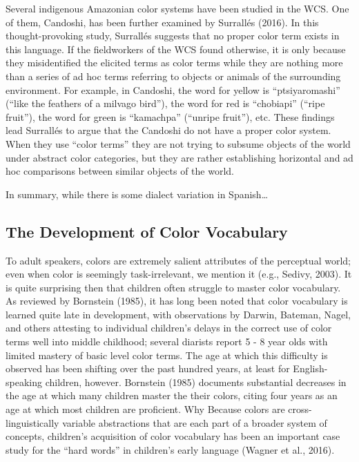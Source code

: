 \documentclass[man]{apa6}
\theoremstyle{definition}
\theoremstyle{definition}
\theoremstyle{definition}
\theoremstyle{remark}
\begin{document}
Several indigenous Amazonian color systems have been studied in the WCS.
One of them, Candoshi, has been further examined by Surrallés (2016). In
this thought-provoking study, Surrallés suggests that no proper color
term exists in this language. If the fieldworkers of the WCS found
otherwise, it is only because they misidentified the elicited terms as
color terms while they are nothing more than a series of ad hoc terms
referring to objects or animals of the surrounding environment. For
example, in Candoshi, the word for yellow is \enquote{ptsiyaromashi}
(\enquote{like the feathers of a milvago bird}), the word for red is
\enquote{chobiapi} (\enquote{ripe fruit}), the word for green is
\enquote{kamachpa} (\enquote{unripe fruit}), etc. These findings lead
Surrallés to argue that the Candoshi do not have a proper color system.
When they use \enquote{color terms} they are not trying to subsume
objects of the world under abstract color categories, but they are
rather establishing horizontal and ad hoc comparisons between similar
objects of the world.

In summary, while there is some dialect variation in Spanish\ldots{}

\subsection{The Development of Color
Vocabulary}\label{the-development-of-color-vocabulary}

To adult speakers, colors are extremely salient attributes of the
perceptual world; even when color is seemingly task-irrelevant, we
mention it (e.g., Sedivy, 2003). It is quite surprising then that
children often struggle to master color vocabulary. As reviewed by
Bornstein (1985), it has long been noted that color vocabulary is
learned quite late in development, with observations by Darwin, Bateman,
Nagel, and others attesting to individual children's delays in the
correct use of color terms well into middle childhood; several diarists
report 5 - 8 year olds with limited mastery of basic level color terms.
The age at which this difficulty is observed has been shifting over the
past hundred years, at least for English-speaking children, however.
Bornstein (1985) documents substantial decreases in the age at which
many children master the their colors, citing four years as an age at
which most children are proficient. Why Because colors are
cross-linguistically variable abstractions that are each part of a
broader system of concepts, children's acquisition of color vocabulary
has been an important case study for the \enquote{hard words} in
children's early language (Wagner et al., 2016).
\end{document}
